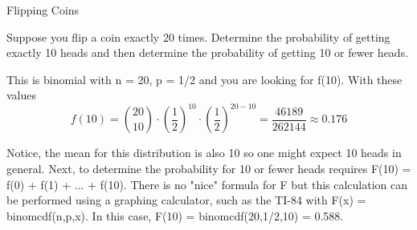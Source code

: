 \documentclass[10pt,]{book}
\theoremstyle{plain}
\theoremstyle{definition}
\theoremstyle{definition}
\theoremstyle{definition}
\numberwithin{equation}{section}
\begin{document}
\par
Flipping Coins%
\par
Suppose you flip a coin exactly 20 times. Determine the probability of getting exactly 10 heads and then determine the probability of getting 10 or fewer heads.
%

This is binomial with n = 20, p = 1/2 and you are looking for f(10). With these values
\begin{equation*}f(10) = \binom{20}{10} \cdot \left ( \frac{1}{2} \right )^{10} \cdot \left ( \frac{1}{2} \right 	)^{20-10} = \frac{46189}{262144} \approx 0.176\end{equation*}
%
\par

Notice, the mean for this distribution is also 10 so one might expect 10 heads in general.  Next, to determine the probability for 10 or fewer heads requires F(10) = f(0) + f(1) + ... + f(10). There is no "nice" formula for F but this calculation can be performed using a graphing calculator, such as the TI-84 with F(x) = binomcdf(n,p,x). In this case, F(10) = binomcdf(20,1/2,10) = 0.588.
%
\typeout{************************************************}
\typeout{************************************************}
\end{document}
